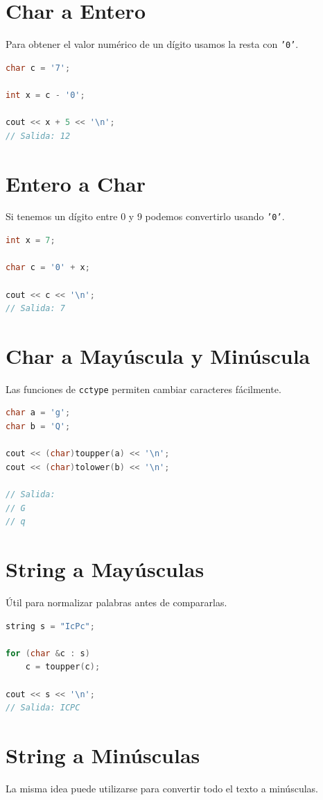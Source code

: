 \documentclass[10pt,twocolumn,letterpaper]{report}
\begin{document}
\section{Char a Entero}
Para obtener el valor numérico de un dígito usamos la resta con \texttt{'0'}.

\begin{lstlisting}[language=C++]
char c = '7';

int x = c - '0';

cout << x + 5 << '\n';
// Salida: 12
\end{lstlisting}

\section{Entero a Char}
Si tenemos un dígito entre 0 y 9 podemos convertirlo usando \texttt{'0'}.

\begin{lstlisting}[language=C++]
int x = 7;

char c = '0' + x;

cout << c << '\n';
// Salida: 7
\end{lstlisting}

\section{Char a Mayúscula y Minúscula}
Las funciones de \texttt{cctype} permiten cambiar caracteres fácilmente.

\begin{lstlisting}[language=C++]
char a = 'g';
char b = 'Q';

cout << (char)toupper(a) << '\n';
cout << (char)tolower(b) << '\n';

// Salida:
// G
// q
\end{lstlisting}

\section{String a Mayúsculas}
Útil para normalizar palabras antes de compararlas.

\begin{lstlisting}[language=C++]
string s = "IcPc";

for (char &c : s)
    c = toupper(c);

cout << s << '\n';
// Salida: ICPC
\end{lstlisting}

\section{String a Minúsculas}
La misma idea puede utilizarse para convertir todo el texto a minúsculas.
\end{document}
